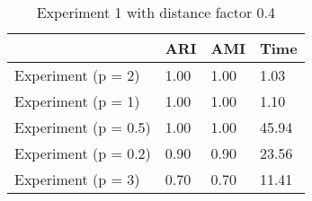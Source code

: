\begin{table}
\centering
\caption{Experiment 1 with distance factor 0.4}
\begin{tabular}{llll}
\toprule
{} &   ARI &   AMI &   Time \\
\midrule
Experiment (p = 2)   &  1.00 &  1.00 &   1.03 \\
Experiment (p = 1)   &  1.00 &  1.00 &   1.10 \\
Experiment (p = 0.5) &  1.00 &  1.00 &  45.94 \\
Experiment (p = 0.2) &  0.90 &  0.90 &  23.56 \\
Experiment (p = 3)   &  0.70 &  0.70 &  11.41 \\
\bottomrule
\end{tabular}
\end{table}
